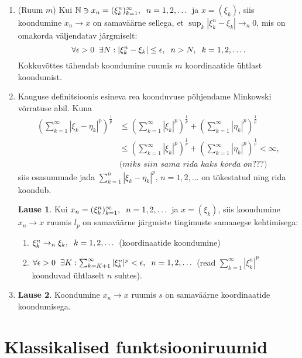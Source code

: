 \documentclass{article}[12pt]
\newcommand{\h}{\hspace{0.2cm}}
\newcommand{\N}{\mathbb{N}}
\theoremstyle{definition}
\theoremstyle{definition}
\theoremstyle{definition}
\newtheorem{lause}{Lause}[section]
\begin{document}
\begin{enumerate}
	\item (Ruum $m$) Kui $\N\ni x_n=(\xi_k^n)_{k=1}^\infty,\h n=1,2,\dots$ ja $x=(\xi_k)$, siis koondumine $x_n\rightarrow x$ on samaväärne sellega, et $\sup_k |\xi_k^n-\xi_k| \rightarrow_n 0$, mis on omakorda väljendatav järgmiselt:
	\[
		\forall \epsilon > 0 \h \exists N: |\xi_k^n-\xi_k|\leq \epsilon,\h n>N,\h k=1,2,\dots .
	\]
	Kokkuvõttes tähendab koondumine ruumis $m$ koordinaatide ühtlast koondumist.
	\setcounter{enumi}{3}
	\item Kauguse definitsioonis esineva rea koonduvuse põhjendame Minkowski võrratuse abil.
	Kuna
	\begin{align*}
		\left( \sum_{k=1}^\infty |\xi_k-\eta_k|^p \right)^\frac{1}{p} &\leq \left( \sum_{k=1}^\infty |\xi_k|^p \right)^\frac{1}{p} + \left( \sum_{k=1}^\infty |\eta_k|^p \right)^\frac{1}{p} \\
		&\leq \left( \sum_{k=1}^\infty |\xi_k|^p \right)^\frac{1}{p} + \left( \sum_{k=1}^\infty |\eta_k|^p \right)^\frac{1}{p} < \infty, \\
		&\textit{(miks siin sama rida kaks korda on???)}
	\end{align*}
	siis osasummade jada $\sum_{k=1}^n |\xi_k-\eta_k|^p$, $n=1,2,\dots$ on tõkestatud ning rida koondub.
	\begin{lause}
		Kui $x_n=(\xi_k^n)_{k=1}^\infty,\h n=1,2,\dots$ ja $x=(\xi_k)$, siis koondumine $x_n\rightarrow x$ ruumis $l_p$ on samaväärne järgmiste tingimuste samaaegse kehtimisega:
		\begin{enumerate}
			\item $\xi_k^n \rightarrow_n \xi_k,\h k=1,2,\dots$ (koordinaatide koondumine)
			\item $\forall \epsilon > 0\h\exists K: \sum_{k=K+1}^\infty |\xi_k^n|^p<\epsilon,\h n=1,2,\dots$ (read $\sum_{k=1}^\infty |\xi_k^n|^p$ koonduvad ühtlaselt $n$ suhtes).
		\end{enumerate}
	\end{lause}
	\item \begin{lause}
		Koondumine $x_n\rightarrow x$ ruumis $s$ on samaväärne koordinaatide koondumisega.
	\end{lause}
\end{enumerate}

\section{Klassikalised funktsiooniruumid}
\end{document}
